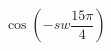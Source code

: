 \begin{ex}[type=calculate]
	\begin{condition}
		\( \cos\left( -sw\dfrac{15\pi}{4}  \right)\)
	\end{condition}
\end{ex}
